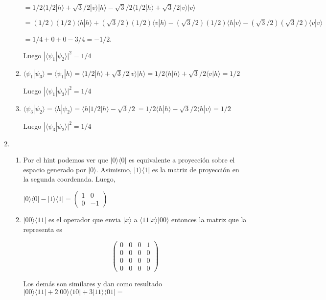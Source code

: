 \documentclass[letter,twoside,12pt]{article}
\begin{document}
\begin{enumerate}
\begin{enumerate}
$ =  1/2 \langle 1/2|h \rangle + \sqrt{3}/2 | v \rangle | h \rangle - \sqrt{3}/2\langle 1/2|h \rangle + \sqrt{3}/2 | v \rangle | v \rangle $

$ = (1/2)(1/2) \langle h|h \rangle + (\sqrt{3}/2)(1/2) \langle v| h \rangle  - (\sqrt{3}/2)(1/2)\langle h |v \rangle - (\sqrt{3}/2) (\sqrt{3}/2) \langle v | v \rangle $

$ = 1/4 + 0 + 0 - 3/4 = - 1/2 $.

Luego $ |\langle \psi_1|\psi_2\rangle|^2 = 1/4 $

\item $ \langle \psi_1 | \psi_3 \rangle = \langle \psi_1 | h \rangle = \langle 1/2|h \rangle + \sqrt{3}/2 | v \rangle | h \rangle = 1/2 \langle h|h \rangle + \sqrt{3}/2 \langle v|h \rangle = 1/2$

Luego $ |\langle \psi_1|\psi_3\rangle|^2 = 1/4 $

\item $ \langle \psi_3 | \psi_2 \rangle = \langle h | \psi_2 \rangle = \langle h | 1/2|h \rangle - \sqrt{3}/2 \ = 1/2\langle h |h \rangle - \sqrt{3}/2 \langle h |v \rangle = 1/2 $

Luego $ |\langle \psi_3|\psi_2\rangle|^2 = 1/4 $

\end{enumerate}

\item \begin{enumerate} \item Por el hint podemos ver que $ |0 \rangle \langle 0| $ es equivalente a proyección sobre el espacio generado por $ |0 \rangle $. Asimismo, $ |1 \rangle \langle 1 | $ es la matriz de proyección en la segunda coordenada. Luego,

$ |0 \rangle \langle 0| - |1 \rangle \langle 1| = \begin{pmatrix}
1 & 0
\\ 0 & -1
\end{pmatrix} $
\item $ |00 \rangle \langle 11|$ es el operador que envia $ |x \rangle $ a $ \langle 11|x \rangle |00 \rangle $ entonces la matriz que la representa es

$$ \begin{pmatrix}
0&0&0&1
\\0&0&0&0
\\0&0&0&0
\\0&0&0&0
\end{pmatrix} $$

Los demás son similares y dan como resultado
$ |00\rangle \langle 11|+2|00 \rangle  \langle 10|+3|11 \rangle \langle 01| = $


\end{enumerate}
\end{enumerate}
\end{document}
